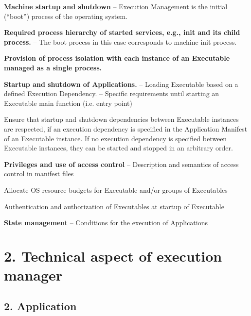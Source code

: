 \begin{DoxyItemize}
\item {\bfseries Machine startup and shutdown} – Execution Management is the initial (“boot”) process of the operating system.
\item {\bfseries Required process hierarchy of started services, e.\+g., init and its child process.} – The boot process in this case corresponds to machine init process.
\item {\bfseries Provision of process isolation with each instance of an Executable managed as a single process.}
\item {\bfseries Startup and shutdown of Applications.} – Loading Executable based on a defined Execution Dependency. – Specific requirements until starting an Executable main function (i.\+e. entry point)
\begin{DoxyItemize}
\item Ensure that startup and shutdown dependencies between Executable instances are respected, if an execution dependency is specified in the Application Manifest of an Executable instance. If no execution dependency is specified between Executable instances, they can be started and stopped in an arbitrary order.
\end{DoxyItemize}
\item {\bfseries Privileges and use of access control} – Description and semantics of access control in manifest files
\begin{DoxyItemize}
\item Allocate OS resource budgets for Executable and/or groups of Executables
\item Authentication and authorization of Executables at startup of Executable
\end{DoxyItemize}
\item {\bfseries State management} – Conditions for the execution of Applications
\end{DoxyItemize}

\section*{2. {\bfseries Technical aspect of execution manager}}

\subsection*{2. {\bfseries Application}}


